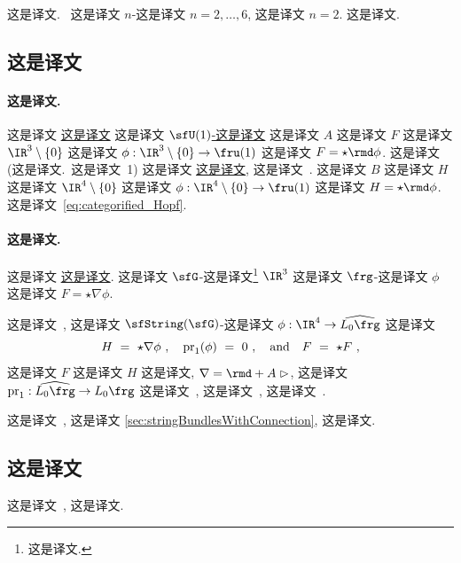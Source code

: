 \documentclass[
    affil-it, %
    auth-lg, %
    british, %
    compression, %
    contents, %
    custom-packages={}, %
    references={bigone}, %
]{lib/preprint}
\renewcommand{\pr}{\mathrm{pr}}
\begin{document}
\begin{body}
 这是译文.~\cite{Borsten:2021ljb} 这是译文 $n$-这是译文 $n=2,\ldots,6$, 这是译文 $n=2$. 这是译文.
        
        \subsection{这是译文}\label{sec:nonAbelianSelfDualString}
        
        \paragraph{这是译文.}
 这是译文 \uline{这是译文} 这是译文 \uline{$\sfU(1)$-这是译文} 这是译文 $A$ 这是译文 $F$ 这是译文 $\IR^3\setminus\{0\}$ 这是译文 $\phi:\IR^3\setminus\{0\}\rightarrow\fru(1)$ 这是译文 $F={\star\rmd\phi}$. 这是译文 (这是译文.~这是译文~1) 这是译文 \uline{这是译文}, 这是译文~\cite{Howe:1997ue}. 这是译文 $B$ 这是译文 $H$ 这是译文 $\IR^4\setminus\{0\}$ 这是译文 $\phi:\IR^4\setminus\{0\}\rightarrow\fru(1)$ 这是译文 $H={\star\rmd\phi}$. 这是译文~\eqref{eq:categorified_Hopf}.
        
        \paragraph{这是译文.}
这是译文 \uline{这是译文}. 这是译文 $\sfG$-这是译文\footnote{这是译文.} $\IR^3$ 这是译文 $\frg$-这是译文 $\phi$ 这是译文 $F={\star\nabla\phi}$. 
        
 这是译文~\cite{Saemann:2017rjm}, 这是译文 $\sfString(\sfG)$-这是译文 $\phi:\IR^4\rightarrow \widehat{L_0\frg}$ 这是译文 
        \begin{equation}\label{eq:non_Abelian_SDS}
            H\ =\ {\star\nabla\phi}~,
            \quad
            \pr_1(\phi)\ =\ 0~,
            \eand
            F\ =\ {\star F}~,
		\end{equation}  这是译文 $F$ 这是译文 $H$ 这是译文, $\nabla=\rmd+A\acton$, 这是译文 $\pr_1:\widehat{L_0\frg}\rightarrow L_0\frg$ 这是译文~\cite{Saemann:2017rjm}, 这是译文~\cite{Saemann:2017rjm}, 这是译文~\cite{Akyol:2012cq}.
        
这是译文~\cite{Saemann:2017rjm}, 这是译文 \cref{sec:stringBundlesWithConnection}, 这是译文.

        \subsection{这是译文}\label{sec:commentsTwistorApproach}
        
 这是译文~\cite{Saemann:2011nb,Saemann:2012uq,Saemann:2013pca,Jurco:2014mva,Jurco:2016qwv,Samann:2017dah}, 这是译文.
        

\end{body}
\end{document}
